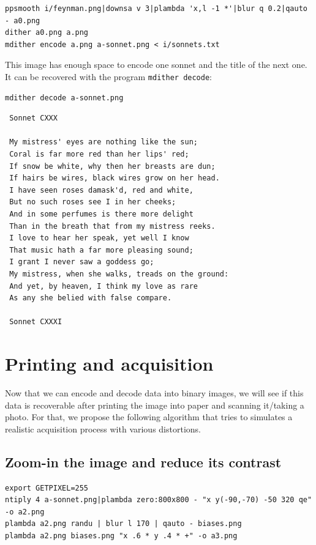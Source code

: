 \begin{verbatim}
ppsmooth i/feynman.png|downsa v 3|plambda 'x,l -1 *'|blur q 0.2|qauto - a0.png
dither a0.png a.png
mdither encode a.png a-sonnet.png < i/sonnets.txt
\end{verbatim}

This image has enough space to encode one sonnet and the title of
the next one.  It can be
recovered with the program \verb+mdither decode+:

 \begin{verbatim}
mdither decode a-sonnet.png
\end{verbatim} %

 \begin{verbatim}
 Sonnet CXXX

 My mistress' eyes are nothing like the sun;
 Coral is far more red than her lips' red;
 If snow be white, why then her breasts are dun;
 If hairs be wires, black wires grow on her head.
 I have seen roses damask'd, red and white,
 But no such roses see I in her cheeks;
 And in some perfumes is there more delight
 Than in the breath that from my mistress reeks.
 I love to hear her speak, yet well I know
 That music hath a far more pleasing sound;
 I grant I never saw a goddess go;
 My mistress, when she walks, treads on the ground:
 And yet, by heaven, I think my love as rare
 As any she belied with false compare.

 Sonnet CXXXI

\end{verbatim} %


\section{Printing and acquisition}

Now that we can encode and decode data into binary images, we will see if
this data is recoverable after printing the image into paper and scanning
it/taking a photo.  For that, we propose the following algorithm that tries
to simulates a realistic acquisition process with various distortions.

\subsection{Zoom-in the image and reduce its contrast}

\begin{verbatim}
export GETPIXEL=255
ntiply 4 a-sonnet.png|plambda zero:800x800 - "x y(-90,-70) -50 320 qe" -o a2.png
plambda a2.png randu | blur l 170 | qauto - biases.png
plambda a2.png biases.png "x .6 * y .4 * +" -o a3.png
\end{verbatim}
\begin{gallery}
\end{gallery}

